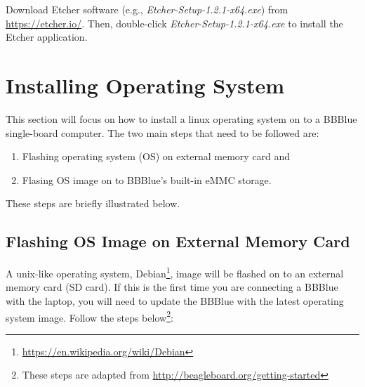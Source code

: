\begin{mdframed}[frametitle=Download and installation, backgroundcolor=yellow!5, roundcorner=7pt,outerlinecolor= blue!70!black,outerlinewidth=1.2]
  Download Etcher software (e.g., \emph{Etcher-Setup-1.2.1-x64.exe}) from \url{https://etcher.io/}. Then, double-click \emph{Etcher-Setup-1.2.1-x64.exe} to install the Etcher application. 
\end{mdframed}




\section{Installing Operating System}
This section will focus on how to install a linux operating system on to a BBBlue single-board computer. The two main steps that need to be followed are:
\begin{enumerate}
    \item Flashing operating system (OS) on external memory card and 
    \item Flasing OS image on to BBBlue's built-in eMMC storage.
\end{enumerate}
%
These steps are briefly illustrated below. 
\subsection{Flashing OS Image on External Memory Card}
\label{sec:flashingOS}

A unix-like operating system, Debian\footnote{\href{https://en.wikipedia.org/wiki/Debian}{https://en.wikipedia.org/wiki/Debian}}, image will be flashed on to an external memory card (SD card). If this is the first time you are connecting a BBBlue with the laptop, you will need to update the BBBlue with the latest operating system image. Follow the steps below\footnote{These steps are adapted from \url{http://beagleboard.org/getting-started}}:

